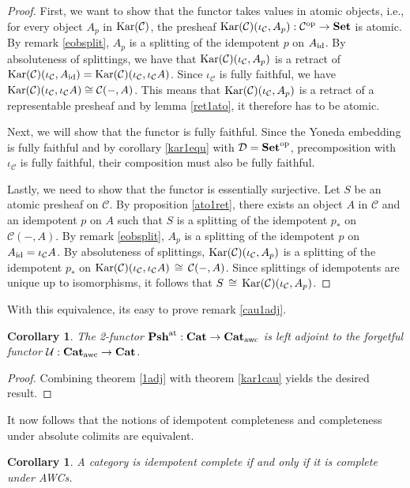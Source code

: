 \documentclass[12pt,oneside,reqno,a4paper]{article}
\newtheorem{corollary}[theorem]{Corollary}
\theoremstyle{definition}
\newcommand{\op}{^\textup{op}}
\newcommand{\Set}{\textbf{\textup{Set}}}
\newcommand{\Cat}{\textbf{\textup{Cat}}}
\newcommand{\Pshattwo}{\textbf{\textup{Psh}}^\textup{at}}
\newcommand{\Kar}[1]{\textup{Kar}(#1)}
\newcommand{\iso}{\,\cong\,}
\newcommand{\id}{\textup{id}}
\newcommand{\C}{\mathcal{C}}
\newcommand{\D}{\mathcal{D}}
\newcommand{\U}{\mathcal{U}}
\begin{document}
\begin{proof}
First, we want to show that the functor takes values in atomic objects, i.e., for every object $A_p$ in $\Kar{\C}$, the presheaf $\Kar{\C}(\iota_\C,A_p):\C\op\to\Set$ is atomic. By remark \ref{eobsplit}, $A_p$ is a splitting of the idempotent $p$ on $A_{\id}$. By absoluteness of splittings, we have that $\Kar{\C}(\iota_\C,A_p)$ is a retract of $\Kar{\C}(\iota_\C,A_{\id})=\Kar{\C}(\iota_\C,\iota_\C A)$. Since $\iota_\C$ is  fully faithful, we have $\Kar{\C}(\iota_\C,\iota_\C A)\cong \C(-,A)$. This means that $\Kar{\C}(\iota_\C,A_p)$ is a retract of a representable presheaf and by lemma \ref{ret1ato}, it therefore has to be atomic.

Next, we will show that the functor is fully faithful. Since the Yoneda embedding is fully faithful and by corollary \ref{kar1equ} with $\D=\Set\op$, precomposition with $\iota_\C$ is fully faithful, their composition must also be fully faithful.

Lastly, we need to show that the functor is essentially surjective. Let $S$ be an atomic presheaf on $\C$. By proposition \ref{ato1ret}, there exists an object $A$ in $\C$ and an idempotent $p$ on $A$ such that $S$ is a splitting of the idempotent $p_*$ on $\C(-,A)$. By remark \ref{eobsplit}, $A_p$ is a splitting of the idempotent $p$ on $A_{\id}=\iota_\C A$. By absoluteness of splittings, $\Kar{\C}(\iota_\C,A_p)$ is a splitting of the idempotent $p_*$ on $\Kar{\C}(\iota_\C,\iota_\C A)\iso\C(-,A)$. Since splittings of idempotents are unique up to isomorphisms, it follows that $S\iso \Kar{\C}(\iota_\C,A_p)$.
\end{proof}

With this equivalence, its easy to prove remark \ref{cau1adj}.

\begin{corollary}
The 2-functor $\Pshattwo:\Cat\to\Cat_{\textup{awc}}$ is left adjoint to the forgetful functor $\U:\Cat_{\textup{awc}}\to\Cat$.
\end{corollary}

\begin{proof}
Combining theorem \ref{1adj} with theorem \ref{kar1cau} yields the desired result.
\end{proof}

It now follows that the notions of idempotent completeness and completeness under absolute colimits are equivalent.

\begin{corollary} \label{icisabc}
A category is idempotent complete if and only if it is complete under AWCs.
\end{corollary}
\end{document}
